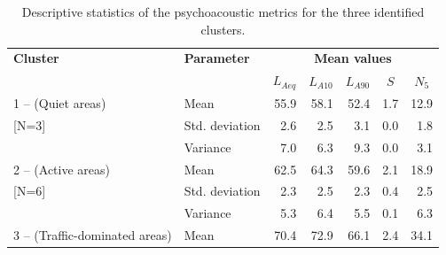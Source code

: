\begin{table}[!h]
  \centering
  \caption{Descriptive statistics of the psychoacoustic metrics for the three identified clusters. \label{tab:NsMapLockClust}}

    \begin{tabular}{llrrrrr}
      \toprule
      \textbf{Cluster}               & \textbf{Parameter} & \multicolumn{5}{c}{\textbf{Mean values }}                                                                                                                       \\
      \cline{3-7}
                                     &                    & \multicolumn{1}{c}{$L_{Aeq}$}             & \multicolumn{1}{c}{$L_{A10}$} & \multicolumn{1}{c}{$L_{A90}$} & \multicolumn{1}{c}{$S$} & \multicolumn{1}{c}{$N_5$} \\
      \hline
      1 -- (Quiet areas)             & Mean               & 55.9                                      & 58.1                          & 52.4                          & 1.7                     & 12.9                      \\
      {[}N=3]                        & Std. deviation     & 2.6                                       & 2.5                           & 3.1                           & 0.0                     & 1.8                       \\
                                     & Variance           & 7.0                                       & 6.3                           & 9.3                           & 0.0                     & 3.1                       \\
      \hline
      2 -- (Active areas)            & Mean               & 62.5                                      & 64.3                          & 59.6                          & 2.1                     & 18.9                      \\
      {[}N=6]                        & Std. deviation     & 2.3                                       & 2.5                           & 2.3                           & 0.4                     & 2.5                       \\
                                     & Variance           & 5.3                                       & 6.4                           & 5.5                           & 0.1                     & 6.3                       \\
      \hline
      3 -- (Traffic-dominated areas) & Mean               & 70.4                                      & 72.9                          & 66.1                          & 2.4                     & 34.1                      \\

\end{tabular}
\end{table}
